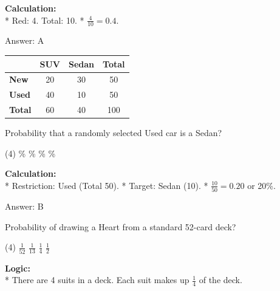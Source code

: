 \documentclass[11pt,paper=a4,answers]{exam}
\begin{document}
\begin{questions}
\begin{solution}
\textbf{Calculation:} \\
* Red: 4. Total: 10.
* $\frac{4}{10} = 0.4$.

\vspace{30pt}

Answer: \colorbox{yellow!100}{A}
\end{solution}

\vspace{60pt}

\question
\begin{center}
\begin{tabular}{|l|c|c|c|}
\hline
 & \textbf{SUV} & \textbf{Sedan} & \textbf{Total} \\ \hline
\textbf{New} & 20 & 30 & 50 \\ \hline
\textbf{Used} & 40 & 10 & 50 \\ \hline
\textbf{Total} & 60 & 40 & 100 \\ \hline
\end{tabular}
\end{center}
Probability that a randomly selected Used car is a Sedan?
\begin{tasks}(4)
    \%
    \%
    \%
    \%
\end{tasks}

\begin{solution}
\textbf{Calculation:} \\
* Restriction: Used (Total 50).
* Target: Sedan (10).
* $\frac{10}{50} = 0.20$ or 20\%.

\vspace{30pt}

Answer: \colorbox{yellow!100}{B}
\end{solution}

\vspace{60pt}

\question
Probability of drawing a Heart from a standard 52-card deck?
\begin{tasks}(4)
    \task $\frac{1}{52}$
    \task $\frac{1}{13}$
    \task $\frac{1}{4}$
    \task $\frac{1}{2}$
\end{tasks}

\begin{solution}
\textbf{Logic:} \\
* There are 4 suits in a deck. Each suit makes up $\frac{1}{4}$ of the deck.


\end{solution}
\end{questions}
\end{document}

